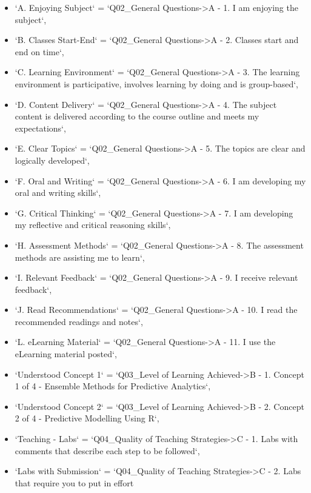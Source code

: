 \documentclass[
]{article}
\begin{document}
\begin{itemize}
\item
  `A. Enjoying Subject` = `Q02\_General Questions-\textgreater A - 1. I
  am enjoying the subject`,
\item
  `B. Classes Start-End` = `Q02\_General Questions-\textgreater A - 2.
  Classes start and end on time`,
\item
  `C. Learning Environment` = `Q02\_General Questions-\textgreater A -
  3. The learning environment is participative, involves learning by
  doing and is group-based`,
\item
  `D. Content Delivery` = `Q02\_General Questions-\textgreater A - 4.
  The subject content is delivered according to the course outline and
  meets my expectations`,
\item
  `E. Clear Topics` = `Q02\_General Questions-\textgreater A - 5. The
  topics are clear and logically developed`,
\item
  `F. Oral and Writing` = `Q02\_General Questions-\textgreater A - 6. I
  am developing my oral and writing skills`,
\item
  `G. Critical Thinking` = `Q02\_General Questions-\textgreater A - 7. I
  am developing my reflective and critical reasoning skills`,
\item
  `H. Assessment Methods` = `Q02\_General Questions-\textgreater A - 8.
  The assessment methods are assisting me to learn`,
\item
  `I. Relevant Feedback` = `Q02\_General Questions-\textgreater A - 9. I
  receive relevant feedback`,
\item
  `J. Read Recommendations` = `Q02\_General Questions-\textgreater A -
  10. I read the recommended readings and notes`,
\item
  `L. eLearning Material` = `Q02\_General Questions-\textgreater A - 11.
  I use the eLearning material posted`,
\item
  `Understood Concept 1` = `Q03\_Level of Learning
  Achieved-\textgreater B - 1. Concept 1 of 4 - Ensemble Methods for
  Predictive Analytics`,
\item
  `Understood Concept 2` = `Q03\_Level of Learning
  Achieved-\textgreater B - 2. Concept 2 of 4 - Predictive Modelling
  Using R`,
\item
  `Teaching - Labs` = `Q04\_Quality of Teaching
  Strategies-\textgreater C - 1. Labs with comments that describe each
  step to be followed`,
\item
  `Labs with Submission` = `Q04\_Quality of Teaching
  Strategies-\textgreater C - 2. Labs that require you to put in effort

\end{itemize}
\end{document}
